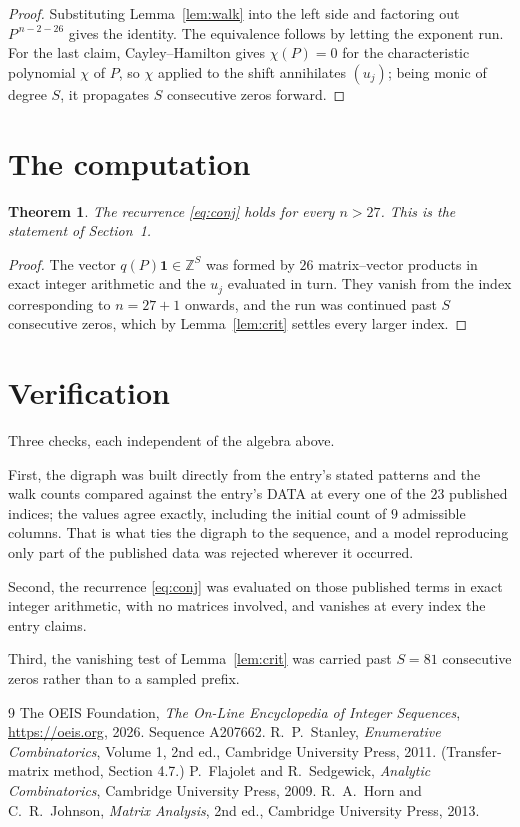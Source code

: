 \documentclass[11pt,a4paper]{article}
\theoremstyle{plain}
\newtheorem{theorem}{Theorem}
\theoremstyle{definition}
\begin{document}
\begin{proof}
Substituting Lemma~\ref{lem:walk} into the left side and factoring out
$P^{\,n-2-26}$ gives the identity. The equivalence follows by letting the exponent
run. For the last claim, Cayley--Hamilton gives $\chi(P)=0$ for the characteristic
polynomial $\chi$ of $P$, so $\chi$ applied to the shift annihilates $(u_j)$; being monic of
degree $S$, it propagates $S$ consecutive zeros forward.
\end{proof}

\section{The computation}

\begin{theorem}
The recurrence \eqref{eq:conj} holds for every $n>27$. This is the statement of
Section~1.
\end{theorem}

\begin{proof}
The vector $q(P)\mathbf{1}\in\mathbb{Z}^{S}$ was formed by $26$ matrix--vector
products in exact integer arithmetic and the $u_j$ evaluated in turn. They vanish from the
index corresponding to $n=27+1$ onwards, and the run was continued past $S$ consecutive
zeros, which by Lemma~\ref{lem:crit} settles every larger index.
\end{proof}

\section{Verification}

Three checks, each independent of the algebra above.

First, the digraph was built directly from the entry's stated patterns and the walk counts
compared against the entry's DATA at every one of the $23$ published indices; the
values agree exactly, including the initial count of $9$ admissible columns. That is
what ties the digraph to the sequence, and a model reproducing only part of the published
data was rejected wherever it occurred.

Second, the recurrence \eqref{eq:conj} was evaluated on those published terms in exact
integer arithmetic, with no matrices involved, and vanishes at every index the entry claims.

Third, the vanishing test of Lemma~\ref{lem:crit} was carried past $S=81$ consecutive
zeros rather than to a sampled prefix.

\begin{thebibliography}{9}
 The OEIS Foundation, \emph{The On-Line Encyclopedia of Integer
Sequences}, \url{https://oeis.org}, 2026. Sequence A207662.
 R.~P.~Stanley, \emph{Enumerative Combinatorics}, Volume 1, 2nd ed.,
Cambridge University Press, 2011. (Transfer-matrix method, Section 4.7.)
 P.~Flajolet and R.~Sedgewick, \emph{Analytic Combinatorics}, Cambridge
University Press, 2009.
 R.~A.~Horn and C.~R.~Johnson, \emph{Matrix Analysis}, 2nd ed., Cambridge
University Press, 2013.
\end{thebibliography}
\end{document}
